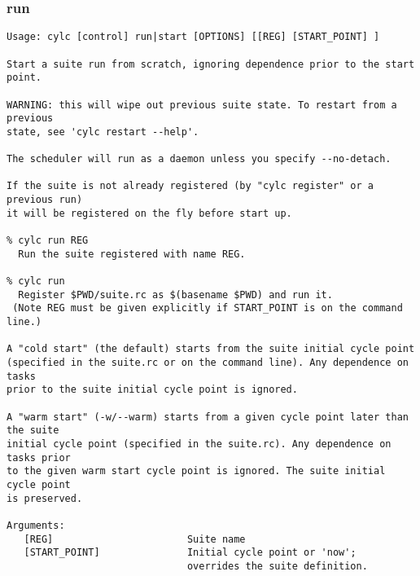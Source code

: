 \subsubsection{run}
\label{run}
\begin{lstlisting}
Usage: cylc [control] run|start [OPTIONS] [[REG] [START_POINT] ]

Start a suite run from scratch, ignoring dependence prior to the start point.

WARNING: this will wipe out previous suite state. To restart from a previous
state, see 'cylc restart --help'.

The scheduler will run as a daemon unless you specify --no-detach.

If the suite is not already registered (by "cylc register" or a previous run)
it will be registered on the fly before start up.

% cylc run REG
  Run the suite registered with name REG.

% cylc run
  Register $PWD/suite.rc as $(basename $PWD) and run it.
 (Note REG must be given explicitly if START_POINT is on the command line.)

A "cold start" (the default) starts from the suite initial cycle point
(specified in the suite.rc or on the command line). Any dependence on tasks
prior to the suite initial cycle point is ignored.

A "warm start" (-w/--warm) starts from a given cycle point later than the suite
initial cycle point (specified in the suite.rc). Any dependence on tasks prior
to the given warm start cycle point is ignored. The suite initial cycle point
is preserved.

Arguments:
   [REG]                       Suite name
   [START_POINT]               Initial cycle point or 'now';
                               overrides the suite definition.


\end{lstlisting}
